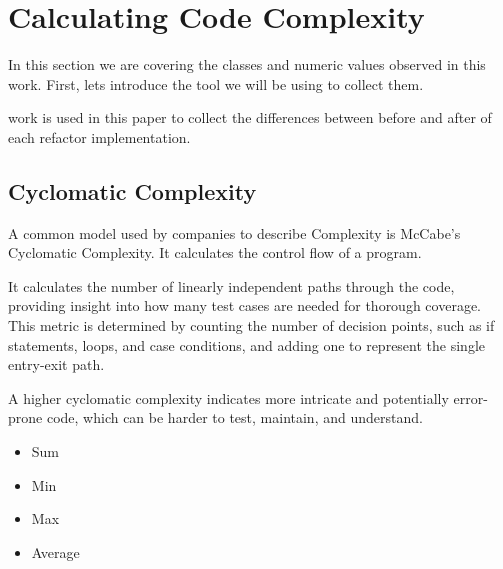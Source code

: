 \section{Calculating Code Complexity}

In this section we are covering the classes and numeric values observed in this work.
First, lets introduce the tool we will be using to collect them.

\cite{article:mozilla} work is used in this paper to collect the differences between
before and after of each refactor implementation.

\subsection{Cyclomatic Complexity}

A common model used by companies to describe Complexity is McCabe's Cyclomatic Complexity.
It calculates the control flow of a program.

It calculates the number of linearly independent paths through the code,
providing insight into how many test cases are needed for thorough coverage.
This metric is determined by counting the number of decision points, such as if statements,
loops, and case conditions, and adding one to represent the single entry-exit path.

A higher cyclomatic complexity indicates more intricate and potentially error-prone code,
which can be harder to test, maintain, and understand.

\begin{itemize}
  \item Sum 
  \item Min 
  \item Max 
  \item Average 
\end{itemize}


